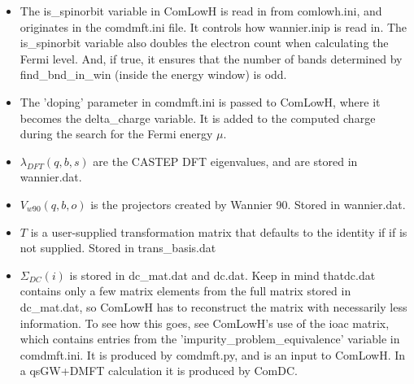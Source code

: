 \documentclass[aps,prb,singlecolumn,preprintnumbers,amsmath,amssymb]{revtex4}
\begin{document}
\begin{itemize}
\item The is\_spinorbit variable in ComLowH is read in from comlowh.ini, and originates in the comdmft.ini file.  It controls how wannier.inip is read in. The is\_spinorbit  variable also doubles the electron count when calculating the Fermi level. And, if true, it ensures that the number of bands determined by find\_bnd\_in\_win (inside the energy window)  is odd. 
\item The 'doping' parameter in comdmft.ini is passed to ComLowH, where it becomes the delta\_charge variable.  It is added to the computed charge during the search for the Fermi energy $\mu$.   
\item $\lambda_{DFT}(q,b,s)$ are the CASTEP DFT eigenvalues, and are stored in wannier.dat.
\item $V_{w90}(q,b,o)$ is the projectors created by Wannier 90.  Stored in wannier.dat.
\item $T$ is a  user-supplied transformation matrix that defaults to the identity if if is not supplied.  Stored in trans\_basis.dat
\item $\Sigma_{DC}(i)$ is stored in dc\_mat.dat and dc.dat.  Keep in mind thatdc.dat contains only a few matrix elements from the full matrix stored in dc\_mat.dat, so ComLowH has to reconstruct the matrix with necessarily less information.  To see how this goes, see ComLowH's use of the ioac matrix, which contains entries from the 'impurity\_problem\_equivalence' variable in comdmft.ini.   It is produced by comdmft.py, and is an input to ComLowH. In a qsGW+DMFT calculation it is produced by ComDC.

\end{itemize}
\end{document}
